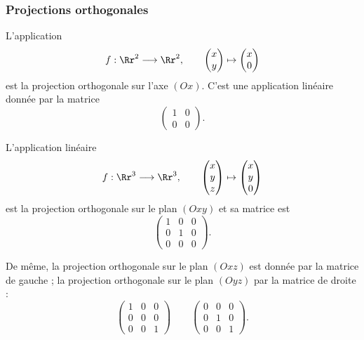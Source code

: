 \documentclass[class=report,crop=false]{standalone}
\begin{document}
\subsubsection{Projections orthogonales}


L'application
$$
f: \Rr^2  \longrightarrow \Rr^2, \qquad \begin{pmatrix}x\\y\end{pmatrix} \mapsto
\begin{pmatrix}x\\0\end{pmatrix}$$
est la projection orthogonale sur l'axe $(Ox)$.
C'est une application linéaire donnée par la matrice
$$\begin{pmatrix} 1 & 0 \\ 0 & 0 \end{pmatrix}.$$

L'application linéaire
$$f: \Rr^3  \longrightarrow \Rr^3, \qquad
\begin{pmatrix}x\\y\\z\end{pmatrix}  \mapsto \begin{pmatrix}x\\y\\0\end{pmatrix}$$
est la projection orthogonale sur le plan $(Oxy)$ et sa matrice est
$$\begin{pmatrix}
1 & 0 & 0\\
0 & 1 & 0\\
0 & 0 & 0
\end{pmatrix}.$$

De même, la projection orthogonale sur le plan $(Oxz)$
est donnée par la matrice de gauche ;
la projection orthogonale sur le plan $(Oyz)$ par la matrice de droite :
$$\begin{pmatrix}
1 & 0 & 0\\
0 & 0 & 0\\
0 & 0 & 1
\end{pmatrix}
\qquad
\begin{pmatrix}
0 & 0 & 0\\
0 & 1 & 0\\
0 & 0 & 1
\end{pmatrix}.$$
\end{document}
